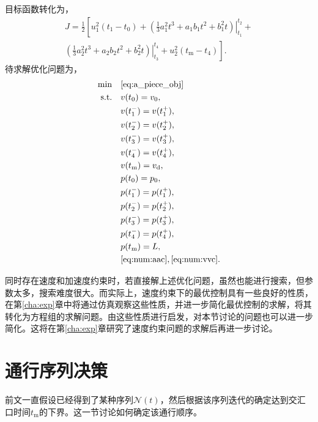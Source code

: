 目标函数转化为，
\begin{equation}
\begin{split}
J=\frac12\left[u_1^2(t_1-t_0)+\left.\left(\frac13a_1^2t^3+a_1b_1t^2+b_1^2t\right)\right|_{t_1}^{t_2}+\right.\\
\left.\left.\left(\frac13a_2^2t^3+a_2b_2t^2+b_2^2t\right)\right|_{t_3}^{t_4}+u_2^2(t_\mathrm{m}-t_4)\right].
\end{split}
\label{eq:a_piece_obj}
\end{equation}
待求解优化问题为，
\begin{align}
\min \quad& \eqref{eq:a_piece_obj}\quad\label{eq:num:aopt1}\\
\text{s.t.}
\quad& v(t_0)=v_0, \quad\\
\quad& v(t_1^-)=v(t_1^+), \quad\\
\quad& v(t_2^-)=v(t_2^+), \quad\\
\quad& v(t_3^-)=v(t_3^+), \quad\\
\quad& v(t_4^-)=v(t_4^+), \quad\\
\quad& v(t_\mathrm{m})=v_\mathrm{d}, \quad\\
\quad& p(t_0)=p_0, \quad\\
\quad& p(t_1^-)=p(t_1^+), \quad\\
\quad& p(t_2^-)=p(t_2^+), \quad\\
\quad& p(t_3^-)=p(t_3^+), \quad\\
\quad& p(t_4^-)=p(t_4^+), \quad\\
\quad& p(t_\mathrm{m})=L, \quad\\
\quad& \eqref{eq:num:aac},\eqref{eq:num:vvc}.\label{eq:num:aoptL}
\end{align}

同时存在速度和加速度约束时，若直接解上述优化问题，虽然也能进行搜索，但参数太多，搜索难度很大。而实际上，速度约束下的最优控制具有一些良好的性质，在第\ref{cha:exp}章中将通过仿真观察这些性质，并进一步简化最优控制的求解，将其转化为方程组的求解问题。由这些性质进行启发，对本节讨论的问题也可以进一步简化。这将在第\ref{cha:exp}章研究了速度约束问题的求解后再进一步讨论。


\section{通行序列决策}
前文一直假设已经得到了某种序列$\mathcal{N}(t)$，然后根据该序列迭代的确定达到交汇口时间$t_\mathrm{m}$的下界。这一节讨论如何确定该通行顺序。

